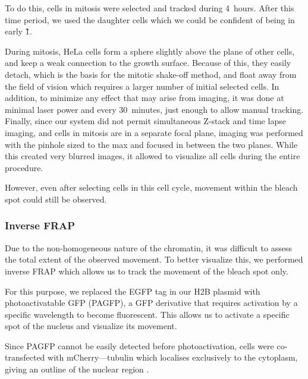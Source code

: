       To do this, cells in mitosis were selected and tracked during 4~hours.
      After this time period, we used the daughter cells which we could be
      confident of being in early \G1{}.

      During mitosis, HeLa cells form a sphere slightly above the plane of
      other cells, and keep a weak connection to the growth surface.
      Because of this, they easily detach, which is the basis for the
      mitotic shake-off method, and float away from the field of vision
      which requires a larger number
      of initial selected cells. In addition, to minimize any effect that
      may arise from imaging, it was done at minimal laser power and every
      30~minutes, just enough to allow manual tracking.
      Finally, since our system did not permit simultaneous Z-stack and time
      lapse imaging, and cells in mitosis are in a separate focal plane,
      imaging was performed with the pinhole sized to the max and focused
      in between the two planes. While this
      created very blurred images, it allowed to visualize all cells during
      the entire procedure.

      However, even after selecting cells in this cell cycle, movement within
      the bleach spot could still be observed.

    \subsubsection{Inverse FRAP}

      Due to the non-homogeneous nature of the chromatin, it was difficult
      to assess the total extent of the observed movement. To
      better visualize this, we performed inverse FRAP which allows us
      to track the movement of the bleach spot only.

      For this purpose, we replaced the EGFP tag in our H2B plasmid
      with photoactivatable GFP (PAGFP), a GFP derivative that requires
      activation by a specific wavelength to become fluorescent. This
      allows us to activate a specific spot of the nucleus and visualize
      its movement.

      Since PAGFP cannot be easily detected before photoactivation, cells
      were co-transfected with mCherry--\textalpha--tubulin which localises
      exclusively to the cytoplasm, giving an outline of the nuclear region
      .

